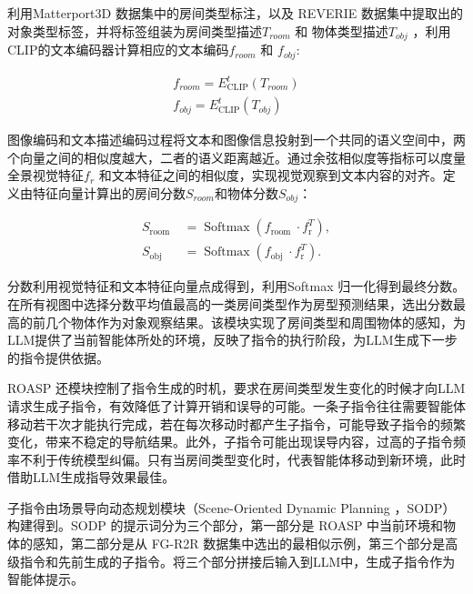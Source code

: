 \documentclass[bachelor]{thesis-uestc}
\begin{document}
利用Matterport3D 数据集中的房间类型标注，以及 REVERIE 数据集中提取出的对象类型标签，并将标签组装为房间类型描述$T_{room}$ 和 物体类型描述$T_{obj}$ ，利用CLIP的文本编码器计算相应的文本编码$f_{room}$ 和 $f_{obj}$:

\begin{equation}
    \begin{aligned}
        f_{room} = E^{t}_{\text{CLIP}}(T_{room})\\
        f_{obj} = E^{t}_{\text{CLIP}}(T_{obj})
    \end{aligned}
\label{fobj}
\end{equation}

图像编码和文本描述编码过程将文本和图像信息投射到一个共同的语义空间中，两个向量之间的相似度越大，二者的语义距离越近。通过余弦相似度等指标可以度量全景视觉特征$f_r$ 和文本特征之间的相似度，实现视觉观察到文本内容的对齐。定义由特征向量计算出的房间分数$S_{room}$和物体分数$S_{obj}$：

\begin{equation}
    \begin{aligned}
        S_{\text {room }} & =\operatorname{Softmax}\left(f_{\text {room }} \cdot f_{\mathrm{r}}^{T}\right), \\
        S_{\text {obj }} & =\operatorname{Softmax}\left(f_{\text {obj }} \cdot f_{\mathrm{r}}^{T}\right) .
        \end{aligned}
\label{s}
\end{equation}

分数利用视觉特征和文本特征向量点成得到，利用Softmax 归一化得到最终分数。在所有视图中选择分数平均值最高的一类房间类型作为房型预测结果，选出分数最高的前几个物体作为对象观察结果。该模块实现了房间类型和周围物体的感知，为LLM提供了当前智能体所处的环境，反映了指令的执行阶段，为LLM生成下一步的指令提供依据。

ROASP 还模块控制了指令生成的时机，要求在房间类型发生变化的时候才向LLM请求生成子指令，有效降低了计算开销和误导的可能。一条子指令往往需要智能体移动若干次才能执行完成，若在每次移动时都产生子指令，可能导致子指令的频繁变化，带来不稳定的导航结果。此外，子指令可能出现误导内容，过高的子指令频率不利于传统模型纠偏。只有当房间类型变化时，代表智能体移动到新环境，此时借助LLM生成指导效果最佳。

子指令由场景导向动态规划模块（Scene-Oriented Dynamic Planning ，SODP）构建得到。SODP 的提示词分为三个部分，第一部分是 ROASP 中当前环境和物体的感知，第二部分是从 FG-R2R 数据集中选出的最相似示例，第三个部分是高级指令和先前生成的子指令。将三个部分拼接后输入到LLM中，生成子指令作为智能体提示。
\end{document}
